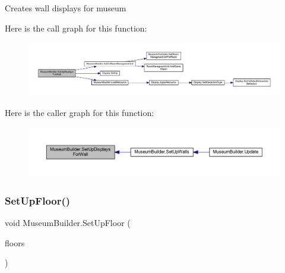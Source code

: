 Creates wall displays for museum 

Here is the call graph for this function\+:
\nopagebreak
\begin{figure}[H]
\begin{center}
\leavevmode
\includegraphics[width=350pt]{class_museum_builder_adbfb12c00a855fe0f816bc18a51a72e5_cgraph}
\end{center}
\end{figure}
Here is the caller graph for this function\+:
\nopagebreak
\begin{figure}[H]
\begin{center}
\leavevmode
\includegraphics[width=350pt]{class_museum_builder_adbfb12c00a855fe0f816bc18a51a72e5_icgraph}
\end{center}
\end{figure}
\mbox{\label{class_museum_builder_a7a68d64f1f418c4cdf43afc48ffa07b1}} 
\subsubsection{\texorpdfstring{Set\+Up\+Floor()}{SetUpFloor()}}
{\footnotesize\ttfamily void Museum\+Builder.\+Set\+Up\+Floor (\begin{DoxyParamCaption}\item[{List$<$ Game\+Object $>$}]{floors }\end{DoxyParamCaption})\hspace{0.3cm}{\ttfamily [private]}}





